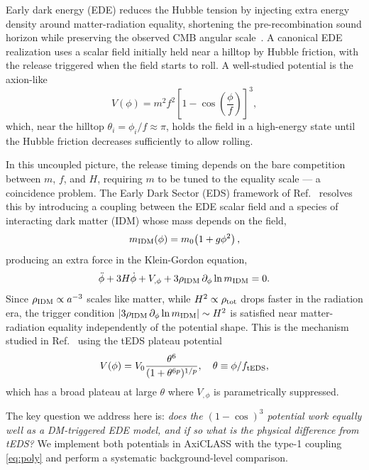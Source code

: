 \documentclass[aps,onecolumn,prd,nofootinbib,superscriptaddress,10pt,longbibliography,floatfix]{revtex4-2}
\newcommand{\dlnm}{\partial_\phi \ln m_{\rm IDM}}
\newcommand{\rIDM}{\rho_{\rm IDM}}
\begin{document}
Early dark energy (EDE) reduces the Hubble tension by injecting extra energy density around matter-radiation equality, shortening the pre-recombination sound horizon while preserving the observed CMB angular scale~\cite{Poulin:2018cxd,Smith:2019ihp}. A canonical EDE realization uses a scalar field initially held near a hilltop by Hubble friction, with the release triggered when the field starts to roll. A well-studied potential is the axion-like
\begin{equation}
V(\phi) = m^2 f^2 \left[1-\cos\!\left(\frac{\phi}{f}\right)\right]^3,
\label{eq:cos3}
\end{equation}
which, near the hilltop $\theta_i = \phi_i/f \approx \pi$, holds the field in a high-energy state until the Hubble friction decreases sufficiently to allow rolling.

In this uncoupled picture, the release timing depends on the bare competition between $m$, $f$, and $H$, requiring $m$ to be tuned to the equality scale — a coincidence problem. The Early Dark Sector (EDS) framework of Ref.~\cite{McDonough:2021} resolves this by introducing a coupling between the EDE scalar field and a species of interacting dark matter (IDM) whose mass depends on the field,
\begin{equation}
m_{\rm IDM}(\phi) = m_0\!\left(1 + g\phi^2\right),
\label{eq:poly}
\end{equation}
producing an extra force in the Klein-Gordon equation,
\begin{equation}
\ddot\phi + 3H\dot\phi + V_{,\phi} + 3\rIDM\,\dlnm = 0.
\label{eq:kg}
\end{equation}
Since $\rIDM \propto a^{-3}$ scales like matter, while $H^2\propto\rho_{\rm tot}$ drops faster in the radiation era, the trigger condition $|3\rIDM\,\dlnm|\sim H^2$ is satisfied near matter-radiation equality independently of the potential shape. This is the mechanism studied in Ref.~\cite{Lin:2022teds} using the tEDS plateau potential
\begin{equation}
V(\phi) = V_0 \frac{\theta^6}{(1+\theta^{6p})^{1/p}}, \quad \theta\equiv\phi/f_{\rm tEDS},
\label{eq:teds}
\end{equation}
which has a broad plateau at large $\theta$ where $V_{,\phi}$ is parametrically suppressed.

The key question we address here is: \emph{does the $(1-\cos)^3$ potential work equally well as a DM-triggered EDE model, and if so what is the physical difference from tEDS?} We implement both potentials in AxiCLASS with the type-1 coupling \cref{eq:poly} and perform a systematic background-level comparison.
\end{document}
